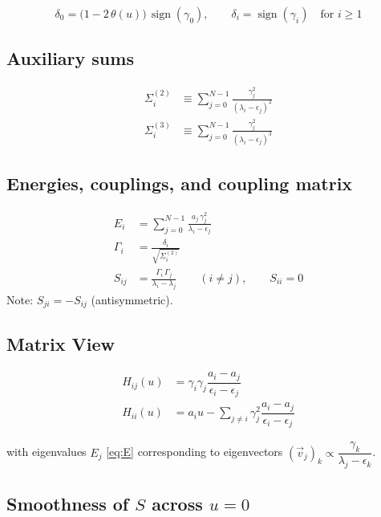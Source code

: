 \documentclass[11pt]{article}
\begin{document}
\begin{equation}\label{eq:delta}
  \delta_0 = \bigl(1 - 2\,\theta(u)\bigr)\,\operatorname{sign}(\gamma_0),
  \qquad
  \delta_i = \operatorname{sign}(\gamma_i) \quad \text{for } i \geq 1
\end{equation}

\subsection{Auxiliary sums}

\begin{align}
  \Sigma^{(2)}_i &\equiv \sum_{j=0}^{N-1} \frac{\gamma_j^2}{(\lambda_i - \epsilon_j)^2}
  \label{eq:sigsq}\\[4pt]
  \Sigma^{(3)}_i &\equiv \sum_{j=0}^{N-1} \frac{\gamma_j^2}{(\lambda_i - \epsilon_j)^3}
  \label{eq:sigcub}
\end{align}

\subsection{Energies, couplings, and coupling matrix}

\begin{align}
  E_i &= \sum_{j=0}^{N-1} \frac{a_j\,\gamma_j^2}{\lambda_i - \epsilon_j}
  \label{eq:E}\\[4pt]
  \Gamma_i &= \frac{\delta_i}{\sqrt{\Sigma^{(2)}_i}}
  \label{eq:Gamma}\\[4pt]
  S_{ij} &= \frac{\Gamma_i\,\Gamma_j}{\lambda_i - \lambda_j}
  \qquad (i \neq j), \qquad S_{ii} = 0
  \label{eq:S}
\end{align}
Note: $S_{ji} = -S_{ij}$ (antisymmetric).

\subsection{Matrix View}\label{sec:matrix}

\begin{align}
  H_{ij}(u) &= \gamma_i \gamma_j \dfrac{a_i-a_j}{\epsilon_i-\epsilon_j}
  \label{eq:Hij}\\[4pt]
 H_{ii}(u) &= a_i u - \sum_{j \neq i}{\gamma_j^2 \dfrac{a_i-a_j}{\epsilon_i-\epsilon_j}}
  \label{eq:Hii}
\end{align}

with eigenvalues $E_j$ \eqref{eq:E} corresponding to eigenvectors $(\vec{v}_j)_k \propto \dfrac{\gamma_k}{\lambda_j-\epsilon_k}$.

\subsection{Smoothness of $S$ across $u=0$}\label{sec:smoothness}
\end{document}
